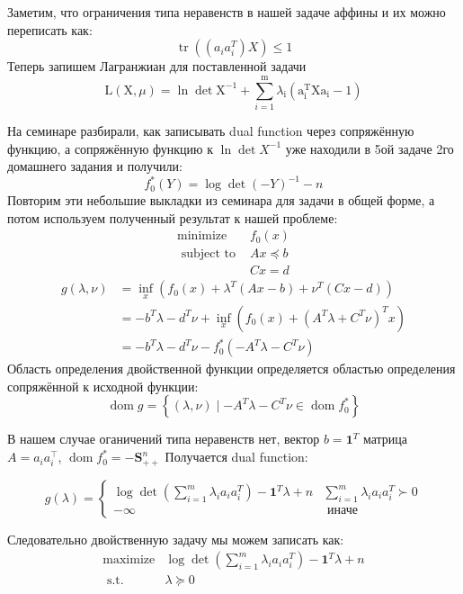\documentclass[a4paper,12pt]{article} %
\begin{document}
Заметим, что ограничения типа неравенств в нашей задаче аффины и их можно переписать как: 
$$
\operatorname{tr}\left(\left(a_{i} a_{i}^{T}\right) X\right) \leq 1
$$
Теперь запишем Лагранжиан для поставленной задачи
$$
\mathrm{L}(\mathrm{X}, \mu)=\ln \operatorname{det} \mathrm{X}^{-1}+\sum_{i=1}^{\mathrm{m}} \lambda_{\mathrm{i}}\left(\mathrm{a}_{\mathrm{i}}^{\mathrm{T}} \mathrm{Xa}_{\mathrm{i}}-1\right)
$$

На семинаре разбирали, как записывать dual function через сопряжённую функцию, а сопряжённую функцию к $ \ln \operatorname{det} X^{-1} $ уже находили в 5ой задаче 2го домашнего задания и получили: 
$$
f_{0}^{*}(Y)=\log \operatorname{det}(-Y)^{-1}-n
$$
Повторим эти небольшие выкладки из семинара для задачи в общей форме, а потом используем полученный результат к нашей проблеме:
$$
\begin{array}{ll}
\operatorname{minimize} & f_{0}(x) \\
\text { subject to } & A x \preceq b \\
& C x=d
\end{array}
$$
$$
\begin{aligned}
g(\lambda, \nu) &=\inf _{x}\left(f_{0}(x)+\lambda^{T}(A x-b)+\nu^{T}(C x-d)\right) \\
&=-b^{T} \lambda-d^{T} \nu+\inf _{x}\left(f_{0}(x)+\left(A^{T} \lambda+C^{T} \nu\right)^{T} x\right) \\
&=-b^{T} \lambda-d^{T} \nu-f_{0}^{*}\left(-A^{T} \lambda-C^{T} \nu\right)
\end{aligned}
$$
Область определения двойственной функции определяется областью определения сопряжённой к исходной функции:
$$
\operatorname{dom} g=\left\{(\lambda, \nu) \mid-A^{T} \lambda-C^{T} \nu \in \operatorname{dom} f_{0}^{*}\right\}
$$

В нашем случае оганичений типа неравенств нет, вектор $ b = \mathbf{1}^{T} $ матрица $ A = a_i a_i^{\top} $, $
\operatorname{dom} f_{0}^{*}=-\mathbf{S}_{++}^{n}
$ Получается dual function: 


$$
g(\lambda)=\left\{\begin{array}{ll}
\log \operatorname{det}\left(\sum_{i=1}^{m} \lambda_{i} a_{i} a_{i}^{T}\right)-\mathbf{1}^{T} \lambda+n & \sum_{i=1}^{m} \lambda_{i} a_{i} a_{i}^{T} \succ 0 \\
-\infty & \text { иначе }
\end{array}\right.
$$

Следовательно двойственную задачу мы можем записать как: 
$$
\begin{array}{ll}
\operatorname{maximize} & \log \operatorname{det}\left(\sum_{i=1}^{m} \lambda_{i} a_{i} a_{i}^{T}\right)-\mathbf{1}^{T} \lambda+n \\
\text { s.t. } & \lambda \succeq 0
\end{array}
$$
\end{document}
